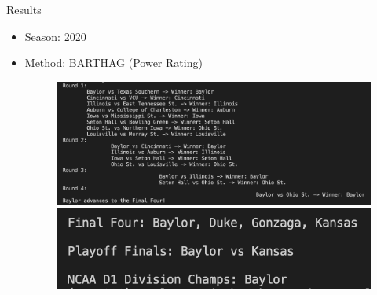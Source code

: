 \documentclass{beamer}
\begin{document}
\begin{frame}{Results}
\begin{itemize}
  \item Season: 2020 
  \item Method: BARTHAG (Power Rating)
  
      \begin{figure}
      \includegraphics[width=0.7\linewidth]{CBB2020_power_south16.png}
      \includegraphics[width=0.7\linewidth]{CBB2020_power_final.png}
    \end{figure}
    
\end{itemize}
\end{frame}
\end{document}
